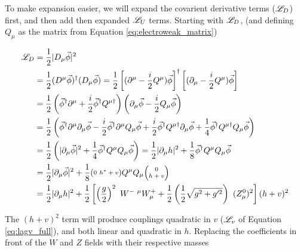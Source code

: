     To make expansion easier, we will expand the covarient derivative terms ($\mathscr{L}_D$) first,
        and then add then expanded $\mathscr{L}_U$ terms.
    Starting with $\mathscr{L}_D$, (and defining $Q_{\mu}$ as the matrix from Equation \ref{eq:electroweak_matrix})

    \begin{equation} \begin{split}
        \Lag_D &= \frac{1}{2} |D_{\mu} \vec{\phi}|^2
            \\&= \frac{1}{2} (D^{\mu} \vec{\phi})^\dag (D_{\mu} \vec{\phi})
                = \frac{1}{2} \left[(\partial^{\mu} - \frac{i}{2}Q^{\mu}) \vec{\phi}\right]^\dag
                \left[(\partial_{\mu} - \frac{i}{2}Q^{\mu}) \vec{\phi}\right]
            \\&= \frac{1}{2} \left(\vec{\phi}^\dag \partial^{\mu} + \frac{i}{2} \vec{\phi}^\dag Q^{\mu \dag} \right)
                \left(\partial_{\mu}\vec{\phi} - \frac{i}{2}Q_{\mu}\vec{\phi} \right)
            \\&= \frac{1}{2} \left(
                \vec{\phi}^\dag \partial^{\mu} \partial_{\mu}\vec{\phi}
                - \frac{i}{2} \vec{\phi}^\dag \partial^{\mu} Q_{\mu}\vec{\phi}
                + \frac{i}{2} \vec{\phi}^\dag Q^{\mu \dag} \partial_{\mu}\vec{\phi}
                + \frac{1}{4} \vec{\phi}^\dag Q^{\mu \dag} Q_{\mu}\vec{\phi}
                \right)
            \\&= \frac{1}{2} \left(
                | \partial_{\mu}\vec{\phi} |^2
                + \frac{1}{4} \vec{\phi}^\dag Q^{\mu} Q_{\mu} \vec{\phi}
                \right)
                = \frac{1}{2} | \partial_{\mu}h |^2 + \frac{1}{8} \vec{\phi}^\dag Q^{\mu}Q_{\mu} \vec{\phi}
            \\&= \frac{1}{2} | \partial_{\mu}\vec{\phi} |^2 + \frac{1}{8} 
                    \minimatrix{0 & h^* + v} Q^{\mu}
                    Q_{\mu} \minimatrix{0 \\ h + v}
            \\&= \frac{1}{2} | \partial_{\mu}h |^2
                + \frac{1}{2} \left[ \left(\frac{g}{2}\right)^2\  W^{-\ \mu} W^+_{\mu}
                + \frac{1}{2} \left(\frac{1}{2}\sqrt{g^2 + g^{\prime 2}}\right)\ (Z^0_{\mu})^2 \right] (h+v)^2
    \end{split} \end{equation}

    The $(h+v)^2$ term will produce couplings quadratic in $v$ ($\mathscr{L}_v$ of Equation \ref{eq:lagv_full}), and both linear and quadratic in $h$.
    Replacing the coefficients in front of the $W$ and $Z$ fields with their respective masses

